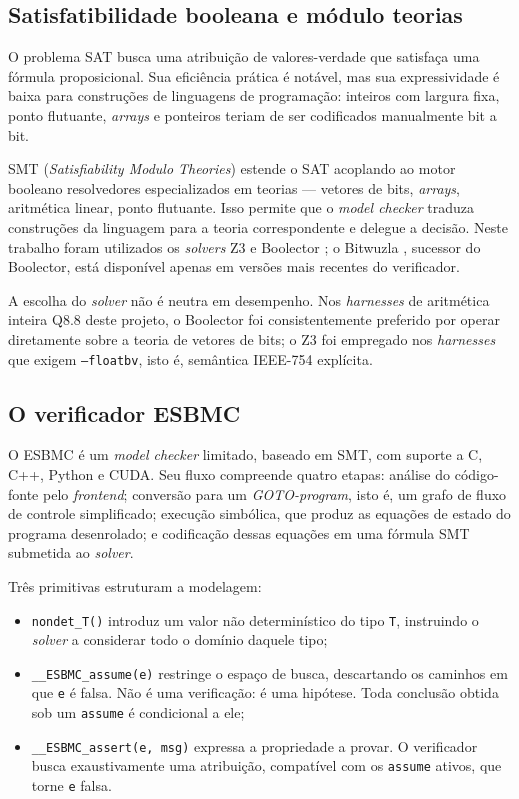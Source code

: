 \subsection{Satisfatibilidade booleana e módulo teorias}

O problema SAT busca uma atribuição de valores-verdade que satisfaça uma fórmula
proposicional. Sua eficiência prática é notável, mas sua expressividade é baixa para
construções de linguagens de programação: inteiros com largura fixa, ponto flutuante,
\textit{arrays} e ponteiros teriam de ser codificados manualmente bit a bit.

SMT (\textit{Satisfiability Modulo Theories}) estende o SAT acoplando ao motor booleano
resolvedores especializados em teorias --- vetores de bits, \textit{arrays}, aritmética
linear, ponto flutuante. Isso permite que o \textit{model checker} traduza construções da
linguagem para a teoria correspondente e delegue a decisão. Neste trabalho foram utilizados
os \textit{solvers} Z3 \cite{demoura2008z3} e Boolector \cite{niemetz2014boolector}; o
Bitwuzla \cite{niemetz2023bitwuzla}, sucessor do Boolector, está disponível apenas em
versões mais recentes do verificador.

A escolha do \textit{solver} não é neutra em desempenho. Nos \textit{harnesses} de
aritmética inteira Q8.8 deste projeto, o Boolector foi consistentemente preferido por operar
diretamente sobre a teoria de vetores de bits; o Z3 foi empregado nos \textit{harnesses} que
exigem \texttt{--floatbv}, isto é, semântica IEEE-754 explícita.

\subsection{O verificador ESBMC}

O ESBMC \cite{gadelha2018esbmc} é um \textit{model checker} limitado, baseado em SMT, com
suporte a C, C++, Python e CUDA. Seu fluxo compreende quatro etapas: análise do código-fonte
pelo \textit{frontend}; conversão para um \textit{GOTO-program}, isto é, um grafo de fluxo de
controle simplificado; execução simbólica, que produz as equações de estado do programa
desenrolado; e codificação dessas equações em uma fórmula SMT submetida ao \textit{solver}.

Três primitivas estruturam a modelagem:

\begin{itemize}[leftmargin=1.4cm]
  \item \texttt{nondet\_T()} introduz um valor não determinístico do tipo \texttt{T},
  instruindo o \textit{solver} a considerar todo o domínio daquele tipo;
  \item \texttt{\_\_ESBMC\_assume(e)} restringe o espaço de busca, descartando os caminhos em
  que \texttt{e} é falsa. Não é uma verificação: é uma hipótese. Toda conclusão obtida sob um
  \texttt{assume} é condicional a ele;
  \item \texttt{\_\_ESBMC\_assert(e, msg)} expressa a propriedade a provar. O verificador
  busca exaustivamente uma atribuição, compatível com os \texttt{assume} ativos, que torne
  \texttt{e} falsa.
\end{itemize}

